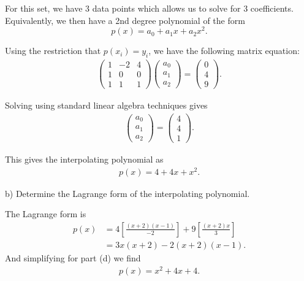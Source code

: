 \documentclass[12pt,a4paper]{article}
\begin{document}
For this set, we have 3 data points which allows us to solve for 3 coefficients. Equivalently, we then have a 2nd degree polynomial of the form
\[
p\left( x \right) = a_0 + a_1 x + a_2 x^2
.\]

Using the restriction that $p\left( x_{i} \right) = y_{i}$, we have the following matrix equation:
\begin{align*}
    \begin{pmatrix}
        1 & -2 & 4 \\
        1 &  0 & 0 \\
        1 &  1 &  1
    \end{pmatrix} 
    \begin{pmatrix}
    a_0 \\ 
    a_1 \\
    a_2
    \end{pmatrix}
    =
    \begin{pmatrix}
    0 \\
    4 \\
    9
    \end{pmatrix} 
.\end{align*}

Solving using standard linear algebra techniques gives
\begin{align*}
    \begin{pmatrix}
    a_0 \\
    a_1 \\
    a_2
    \end{pmatrix}
    =
   \begin{pmatrix}
   4 \\
   4 \\
   1
   \end{pmatrix}  
.\end{align*}

This gives the interpolating polynomial as
\begin{align*}
    p(x) = 4 + 4x + x^2
.\end{align*}

b) Determine the Lagrange form of the interpolating polynomial.

The Lagrange form is 
\begin{align*}
    p(x) &= 4\left[ \frac{\left( x+2 \right)\left( x-1 \right)}{-2} \right] + 9\left[ \frac{\left( x+2 \right)x}{3} \right] \\
    &= 3x\left( x+2 \right) -2\left( x+2 \right)\left( x-1 \right)
.\end{align*}
And simplifying for part (d) we find
\begin{align*}
   p\left( x \right) = x^2 + 4x + 4 
.\end{align*}
\end{document}
